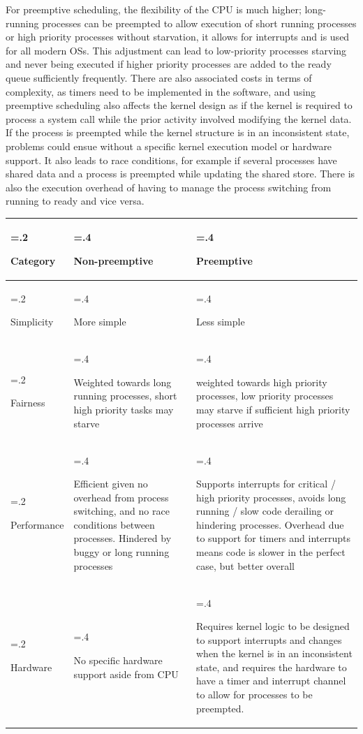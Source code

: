 \documentclass[]{article}
\begin{document}
        For preemptive scheduling, the flexibility of the CPU is much higher; long-running processes can be preempted to allow execution of short running processes or high priority processes without starvation, it allows for interrupts and is used for all modern OSs. This adjustment can lead to low-priority processes starving and never being executed if higher priority processes are added to the ready queue sufficiently frequently. There are also associated costs in terms of complexity, as timers need to be implemented in the software, and using preemptive scheduling also affects the kernel design as if the kernel is required to process a system call while the prior activity involved modifying the kernel data. If the process is preempted while the kernel structure is in an inconsistent state, problems could ensue without a specific kernel execution model or hardware support. It also leads to race conditions, for example if several processes have shared data and a process is preempted while updating the shared store. There is also the execution overhead of having to manage the process switching from running to ready and vice versa.

    \begin{tabularx}{\textwidth} {
       >{\hsize=.2\hsize\raggedright\arraybackslash}X
       >{\hsize=.4\hsize\raggedright\arraybackslash}X
       >{\hsize=.4\hsize\raggedright\arraybackslash}X  } \hline\hline
     Category & Non-preemptive & Preemptive \\ \hline
     Simplicity & More simple & Less simple \\
     Fairness & Weighted towards long running processes, short high priority tasks may starve & weighted towards high priority processes, low priority processes may starve if sufficient high priority processes arrive \\
     Performance & Efficient given no overhead from process switching, and no race conditions between processes. Hindered by buggy or long running processes & Supports interrupts for critical / high priority processes, avoids long running / slow code derailing or hindering processes. Overhead due to support for timers and interrupts means code is slower in the perfect case, but better overall\\
     Hardware & No specific hardware support aside from CPU & Requires kernel logic to be designed to support interrupts and changes when the kernel is in an inconsistent state, and requires the hardware to have a timer and interrupt channel to allow for processes to be preempted. \\ \hline\hline
    \end{tabularx}
\end{document}

